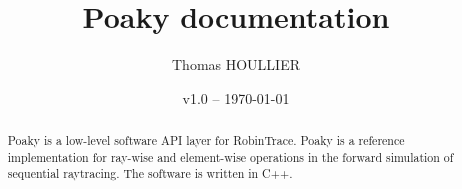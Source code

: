 \documentclass[letterpaper]{article}
\title{Poaky documentation}
\author{Thomas HOULLIER}
\begin{document}
\frenchspacing
\date{v1.0 -- \today}
\maketitle
\thispagestyle{FirstPage}

\begin{abstract}
Poaky is a low-level software API layer for RobinTrace. Poaky is a
reference implementation for ray-wise and element-wise operations in
the forward simulation of sequential raytracing. The software is
written in C++.
\end{abstract}


\begin{versionhistory}
\end{versionhistory}
\setcounter{table}{0} %

\tableofcontents
\pagestyle{plain}








\printglossary[type=\acronymtype,style=index]
\appendix
\cleardoublepage

\apptocmd{\thebibliography}{\raggedright}{}{}
\begingroup
{}
\setlength\bibitemsep{0pt}
\printbibliography
\endgroup
\end{document}
